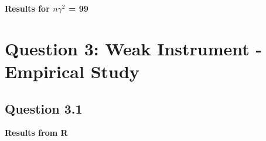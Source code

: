 \documentclass[11pt]{article}
\begin{document}
\begin{center}
	
	\centering
	
	\textbf{Results for $n \gamma^2$ = 99}\par\medskip
	\scalebox{1}{
		
	}
\end{center}




\section{Question 3: Weak Instrument - Empirical Study}

\subsection{Question 3.1}

\begin{center}
	
	\centering
	
	\textbf{Results from R}\par\medskip
	\scalebox{1}{
		
	}
\end{center}



\end{document}
